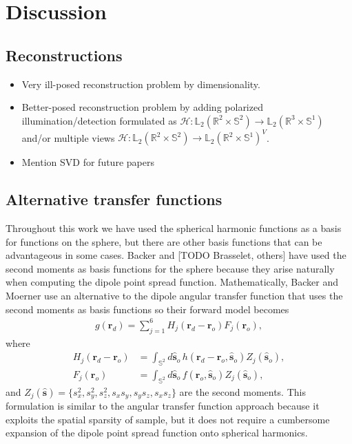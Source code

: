 \documentclass[]{osa-article}
\providecommand{\mc}[1]{\mathcal{#1}}
\providecommand{\ro}{\mathbf{\mathbf{r}}_o}
\providecommand{\so}{\mathbf{\hat{s}}_o}
\providecommand{\rd}{\mathbf{r}_d}
\providecommand{\mh}[1]{\mathbf{\hat{#1}}}
\providecommand{\mbb}[1]{\mathbb{#1}}
\begin{document}
\section{Discussion}\label{sec:discussion}
\subsection{Reconstructions}
\begin{itemize}
\item Very ill-posed reconstruction problem by dimensionality.
\item Better-posed reconstruction problem by adding polarized illumination/detection
  formulated as $\mc{H}: \mbb{L}_2(\mbb{R}^2\times\mbb{S}^2) \rightarrow \mbb{L}_2(\mbb{R}^3\times\mbb{S}^1)$ and/or multiple views $\mc{H}: \mbb{L}_2(\mbb{R}^2\times\mbb{S}^2) \rightarrow \mbb{L}_2(\mbb{R}^2\times\mbb{S}^1)^V$.
\item Mention SVD for future papers
\end{itemize}


\subsection{Alternative transfer functions}
Throughout this work we have used the spherical harmonic functions as a basis
for functions on the sphere, but there are other basis functions that can be
advantageous in some cases. Backer and [TODO Brasselet, others] have used
the second moments as basis functions for the sphere because they arise
naturally when computing the dipole point spread function. Mathematically,
Backer and Moerner \cite{backer2014} use an alternative to the dipole angular
transfer function that uses the second moments as basis functions so their
forward model becomes
\begin{align}
  g(\rd) = \sum_{j=1}^6 H_j(\rd - \ro)F_j(\ro),
\end{align}
where
\begin{align}
  H_j(\rd - \ro) &= \int_{\mbb{S}^2}d\so\, h(\rd - \ro, \so)Z_j(\so),\\
  F_j(\ro) &= \int_{\mbb{S}^2}d\so\, f(\ro, \so)Z_j(\so),
\end{align}
and $Z_j(\mh{s}) = \{s_x^2, s_y^2, s_z^2, s_xs_y, s_ys_z, s_xs_z\}$ are the
second moments. This formulation is similar to the angular transfer function
approach because it exploits the spatial sparsity of sample, but it does not
require a cumbersome expansion of the dipole point spread function onto
spherical harmonics.
\end{document}
